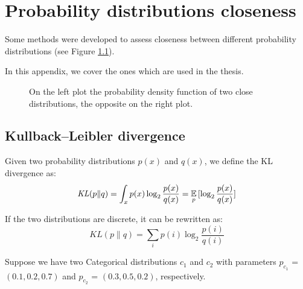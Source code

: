\chapter{Probability distributions closeness}
Some methods were developed to assess closeness between different probability distributions (see Figure \ref{fig:diffkl}).

In this appendix, we cover the ones which are used in the thesis.

\begin{figure}[h]
    \centering
    \hfill
    \caption{On the left plot the probability density function of two close distributions, the opposite on the right plot.}
    \label{fig:diffkl}
\end{figure}

\section{Kullback–Leibler divergence}
Given two probability distributions $p(x)$ and $q(x)$, we define the KL divergence as:
\[ \mathit{KL}(p \| q) = \int_x p(x) \log_2 \frac{p(x)}{q(x)} = \operatorname*{\mathbb{E}}_p{[\log_2 \frac{p(x)}{q(x)}]}\]

If the two distributions are discrete, it can be rewritten as:
\[ \mathit{KL}(p \| q) = \sum_i p(i) \log_2 \frac{p(i)}{q(i)}\]

Suppose we have two Categorical distributions $c_1$ and $c_2$ with parameters $p_{c_1}$ = $(0.1, 0.2, 0.7)$ and $p_{c_2}$ = $(0.3, 0.5, 0.2)$, respectively.

